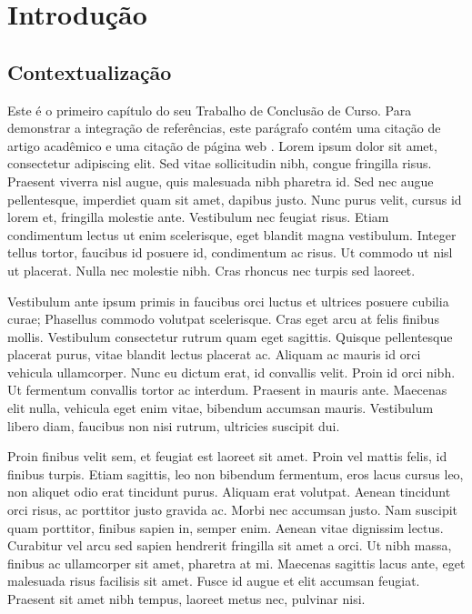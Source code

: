 \chapter{Introdução}

\section{Contextualização}
\label{sec:contextualizacao}

Este é o primeiro capítulo do seu Trabalho de Conclusão de Curso. Para demonstrar a integração de referências, este parágrafo contém uma citação de artigo acadêmico \cite{exemplo2026} e uma citação de página web \cite{devcontainer}. Lorem ipsum dolor sit amet, consectetur adipiscing elit. Sed vitae sollicitudin nibh, congue fringilla risus. Praesent viverra nisl augue, quis malesuada nibh pharetra id. Sed nec augue pellentesque, imperdiet quam sit amet, dapibus justo. Nunc purus velit, cursus id lorem et, fringilla molestie ante. Vestibulum nec feugiat risus. Etiam condimentum lectus ut enim scelerisque, eget blandit magna vestibulum. Integer tellus tortor, faucibus id posuere id, condimentum ac risus. Ut commodo ut nisl ut placerat. Nulla nec molestie nibh. Cras rhoncus nec turpis sed laoreet.

Vestibulum ante ipsum primis in faucibus orci luctus et ultrices posuere cubilia curae; Phasellus commodo volutpat scelerisque. Cras eget arcu at felis finibus mollis. Vestibulum consectetur rutrum quam eget sagittis. Quisque pellentesque placerat purus, vitae blandit lectus placerat ac. Aliquam ac mauris id orci vehicula ullamcorper. Nunc eu dictum erat, id convallis velit. Proin id orci nibh. Ut fermentum convallis tortor ac interdum. Praesent in mauris ante. Maecenas elit nulla, vehicula eget enim vitae, bibendum accumsan mauris. Vestibulum libero diam, faucibus non nisi rutrum, ultricies suscipit dui.

Proin finibus velit sem, et feugiat est laoreet sit amet. Proin vel mattis felis, id finibus turpis. Etiam sagittis, leo non bibendum fermentum, eros lacus cursus leo, non aliquet odio erat tincidunt purus. Aliquam erat volutpat. Aenean tincidunt orci risus, ac porttitor justo gravida ac. Morbi nec accumsan justo. Nam suscipit quam porttitor, finibus sapien in, semper enim. Aenean vitae dignissim lectus. Curabitur vel arcu sed sapien hendrerit fringilla sit amet a orci. Ut nibh massa, finibus ac ullamcorper sit amet, pharetra at mi. Maecenas sagittis lacus ante, eget malesuada risus facilisis sit amet. Fusce id augue et elit accumsan feugiat. Praesent sit amet nibh tempus, laoreet metus nec, pulvinar nisi.

